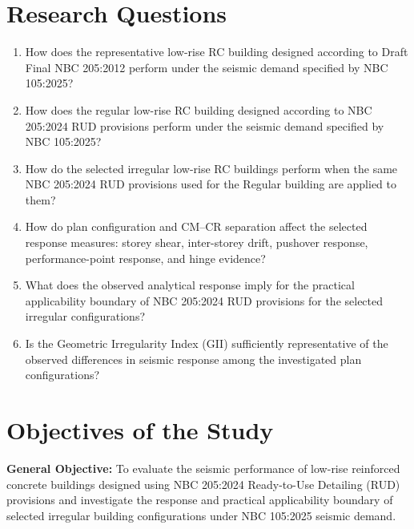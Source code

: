 \section{Research Questions}
\begin{enumerate}[leftmargin=1.0cm,itemsep=0.30em,topsep=0.25em,parsep=0pt]
\item How does the representative low-rise RC building designed according to Draft Final NBC 205:2012 perform under the seismic demand specified by NBC 105:2025?
\item How does the regular low-rise RC building designed according to NBC 205:2024 RUD provisions perform under the seismic demand specified by NBC 105:2025?
\item How do the selected irregular low-rise RC buildings perform when the same NBC 205:2024 RUD provisions used for the Regular building are applied to them?
\item How do plan configuration and CM--CR separation affect the selected response measures: storey shear, inter-storey drift, pushover response, performance-point response, and hinge evidence?
\item What does the observed analytical response imply for the practical applicability boundary of NBC 205:2024 RUD provisions for the selected irregular configurations?
\item Is the Geometric Irregularity Index (GII) sufficiently representative of the observed differences in seismic response among the investigated plan configurations?
\end{enumerate}

\section{Objectives of the Study}
\noindent\textbf{General Objective:} To evaluate the seismic performance of low-rise reinforced concrete buildings designed using NBC 205:2024 Ready-to-Use Detailing (RUD) provisions and investigate the response and practical applicability boundary of selected irregular building configurations under NBC 105:2025 seismic demand.

